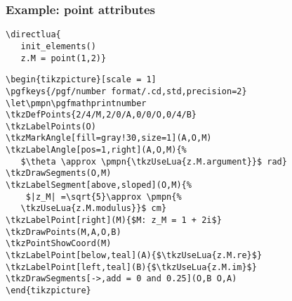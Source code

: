 \subsubsection{Example: point attributes}
\label{ssub:example_point_attributes}

\hspace*{\fill}

\begin{verbatim}
\directlua{
   init_elements()
   z.M = point(1,2)}
\end{verbatim}
\let\pmpn\pgfmathprintnumber
\DeleteShortVerb{\|}

\begin{verbatim}
\begin{tikzpicture}[scale = 1]
\pgfkeys{/pgf/number format/.cd,std,precision=2}
\let\pmpn\pgfmathprintnumber
\tkzDefPoints{2/4/M,2/0/A,0/0/O,0/4/B}
\tkzLabelPoints(O)
\tkzMarkAngle[fill=gray!30,size=1](A,O,M)
\tkzLabelAngle[pos=1,right](A,O,M){%
   $\theta \approx \pmpn{\tkzUseLua{z.M.argument}}$ rad}
\tkzDrawSegments(O,M)
\tkzLabelSegment[above,sloped](O,M){%
    $|z_M| =\sqrt{5}\approx \pmpn{%
   \tkzUseLua{z.M.modulus}}$ cm}
\tkzLabelPoint[right](M){$M: z_M = 1 + 2i$}
\tkzDrawPoints(M,A,O,B)
\tkzPointShowCoord(M)
\tkzLabelPoint[below,teal](A){$\tkzUseLua{z.M.re}$}
\tkzLabelPoint[left,teal](B){$\tkzUseLua{z.M.im}$}
\tkzDrawSegments[->,add = 0 and 0.25](O,B O,A)
\end{tikzpicture}
\end{verbatim}


